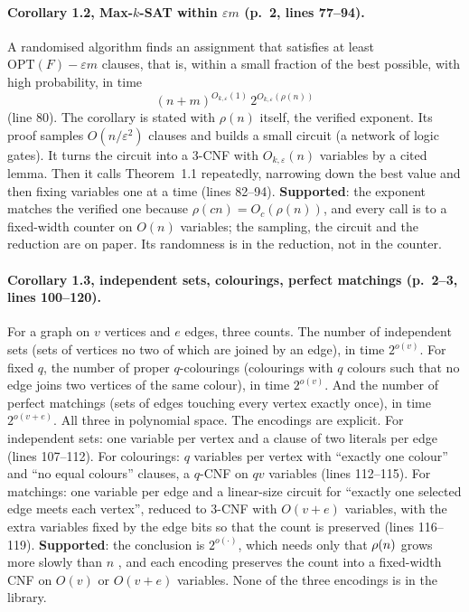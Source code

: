 \paragraph{Corollary 1.2, Max-$k$-SAT within $\varepsilon m$ (p.~2, lines 77--94).}
A randomised algorithm finds an assignment that satisfies at least
$\mathrm{OPT}(F) - \varepsilon m$ clauses, that is, within a small
fraction of the best possible, with high probability, in time
\[
  (n+m)^{O_{k,\varepsilon}(1)}\,2^{O_{k,\varepsilon}(\rho(n))}
\]
(line 80). The corollary is stated with $\rho(n)$ itself, the verified
exponent. Its proof samples $O(n/\varepsilon^2)$ clauses and builds a small circuit (a network of logic gates). It turns the circuit into a 3-CNF with
$O_{k,\varepsilon}(n)$ variables by a cited lemma. Then it calls Theorem~1.1 repeatedly, narrowing down the best value and then fixing variables one at a time (lines 82--94).
\textbf{Supported}: the exponent matches the verified one because
$\rho(cn) = O_c(\rho(n))$, and every call is to a fixed-width counter on
$O(n)$ variables; the sampling, the circuit and the reduction are on
paper. Its randomness is in the reduction, not in the counter.

\paragraph{Corollary 1.3, independent sets, colourings, perfect matchings (p.~2--3, lines 100--120).}
For a graph on $v$ vertices and $e$ edges, three counts. The number of
independent sets (sets of vertices no two of which are joined by an
edge), in time $2^{o(v)}$. For fixed $q$, the number of proper
$q$-colourings (colourings with $q$ colours such that no edge joins two
vertices of the same colour), in time $2^{o(v)}$. And the number of
perfect matchings (sets of edges touching every vertex exactly once), in
time $2^{o(v+e)}$. All three in polynomial space. The encodings are
explicit. For independent sets: one variable per vertex and a clause of
two literals per edge (lines 107--112). For colourings: $q$ variables per
vertex with ``exactly one colour'' and ``no equal colours'' clauses, a
$q$-CNF on $qv$ variables (lines 112--115). For matchings: one variable
per edge and a linear-size circuit for ``exactly one selected edge meets
each vertex'', reduced to 3-CNF with $O(v+e)$ variables, with the extra
variables fixed by the edge bits so that the count is preserved (lines
116--119). \textbf{Supported}: the conclusion is
$2^{o(\cdot)}$, which needs only that $\rho(n)$ grows more slowly than $n$
, and each encoding preserves the count into a
fixed-width CNF on $O(v)$ or $O(v+e)$ variables. None of the three
encodings is in the library.


